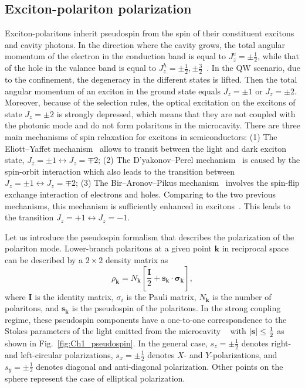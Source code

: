 \subsection{Exciton-polariton polarization}
Exciton-polaritons inherit pseudospin from the spin of their constituent excitons and cavity photons.
In the direction where the cavity grows, the total angular momentum of the electron in the conduction band is equal to $J_z^e=\pm \frac{1}{2}$, while that of the hole in the valance band is equal to $J_z^h = \pm \frac{1}{2}, \pm\frac{3}{2}$~\cite{Shelykh:2009aa}.
In the QW scenario, due to the confinement, the degeneracy in the different states is lifted.
Then the total angular momentum of an exciton in the ground state equals $J_z=\pm 1$ or $J_z =\pm 2$.
Moreover, because of the selection rules, the optical excitation on the excitons of state $J_z=\pm 2$ is strongly depressed, which means that they are not coupled with the photonic mode and do not form polaritons in the microcavity.
There are three main mechanisms of spin relaxation for excitons in semiconductors: (1) The Eliott--Yaffet mechanism~\cite{PhysRev.96.266} allows to transit between the light and dark exciton state, $J_z = \pm 1 \leftrightarrow J_z=\mp2$; (2) The D'yakonov--Perel mechanism~\cite{dyakonov1972spin} is caused by the spin-orbit interaction which also leads to the transition between $J_z = \pm 1 \leftrightarrow J_z=\mp2$; (3) The Bir--Aronov--Pikus mechanism~\cite{pikus1971exchange} involves the spin-flip exchange interaction of electrons and holes. Comparing to the two previous mechanisms, this mechanism is sufficiently enhanced in excitons~\cite{Maialle:1993aa}. This leads to the transition $J_z = +1 \leftrightarrow J_z=-1$.


Let us introduce the pseudospin formalism that describes the polarization of the polariton mode.
Lower-branch polaritons at a given point $\mathbf{k}$ in reciprocal space can be described by a $2\times 2$ density matrix as
%
\begin{equation}
\rho_\mathbf{k} = N_\mathbf{k} \left[ \frac{\mathbf{I}}{2} + \mathbf{s}_\mathbf{k}\cdot \mathbf{\sigma}_\mathbf{k} \right],
\label{eq:Ch1_pseudospin}
\end{equation}
%
where $\mathbf{I}$ is the identity matrix, $\sigma_i$ is the Pauli matrix, $N_\mathbf{k}$ is the number of polaritons, and $\mathbf{s}_\mathbf{k}$ is the pseudospin of the polaritons.
In the strong coupling regime, these pseudospin components have a one-to-one correspondence to the Stokes parameters of the light emitted from the microcavity ~\cite{Kavokin:2004aa} with $\abs{\mathbf{s}}\leq \frac{1}{2}$ as shown in Fig.~\ref{fig:Ch1_pseudospin}.
In the general case, $s_z= \pm\frac{1}{2}$ denotes right- and left-circular polarizations, $s_x = \pm\frac{1}{2}$ denotes $X$- and $Y$-polarizations, and $s_y= \pm \frac{1}{2}$ denotes diagonal and anti-diagonal polarization.
Other points on the sphere represent the case of elliptical polarization.

